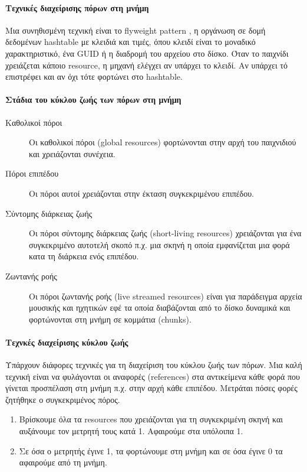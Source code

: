 \paragraph{Τεχνικές διαχείρισης πόρων στη μνήμη}
Μια συνηθισμένη τεχνική είναι το flyweight pattern \cite{Gamma:1995:DPE:186897}, η οργάνωση σε δομή δεδομένων hashtable με κλειδιά και τιμές, όπου κλειδί είναι το μοναδικό χαρακτηριστικό, ένα GUID ή η διαδρομή του αρχείου στο δίσκο. Όταν το παιχνίδι χρειάζεται κάποιο resource, η μηχανή ελέγχει αν υπάρχει το κλειδί. Αν υπάρχει τό επιστρέφει και αν όχι τότε φορτώνει στο hashtable.

\paragraph{Στάδια του κύκλου ζωής των πόρων στη μνήμη}
\begin{description}
\item [Καθολικοί πόροι] Οι καθολικοί πόροι (global resources) φορτώνονται στην αρχή του παιχνιδιού και χρειάζονται συνέχεια.
\item [Πόροι επιπέδου] Οι πόροι αυτοί χρειάζονται στην έκταση συγκεκριμένου επιπέδου.
\item [Σύντομης διάρκειας ζωής] Οι πόροι σύντομης διάρκειας ζωής (short-living resources) χρειάζονται για ένα συγκεκριμένο αυτοτελή σκοπό π.χ. μια σκηνή η οποία εμφανίζεται μια φορά κατα τη διάρκεια ενός επιπέδου.
\item [Zωντανής ροής] Οι πόροι ζωντανής ροής (live streamed resources) είναι για παράδειγμα αρχεία μουσικής και ηχητικών εφέ τα οποία διαβάζονται από το δίσκο δυναμικά και φορτώνονται στη μνήμη σε κομμάτια (chunks).
\end{description}

\paragraph{Τεχνκές διαχείρισης κύκλου ζωής}
Υπάρχουν διάφορες τεχνικές για τη διαχείριση του κύκλου ζωής των πόρων. Μια καλή τεχνική είναι να φυλάγονται οι αναφορές (references) στα αντικείμενα κάθε φορά που γίνεται προσπέλαση στη μνήμη π.χ. στην αρχή κάθε επιπέδου.
Μετράται πόσες φορές ζητήθηκε ο συγκεκριμένος πόρος.  
\begin{enumerate}
	\item Βρίσκουμε όλα τα resources που χρειάζονται για τη συγκεκριμένη σκηνή και αυξάνουμε τον μετρητή τους κατά 1. Αφαιρούμε στα υπόλοιπα 1.
	\item Σε όσα ο μετρητής έγινε 1, τα φορτώνουμε στη μνήμη και σε όσα έγινε 0 τα αφαιρούμε από τη μνήμη.
\end{enumerate}


